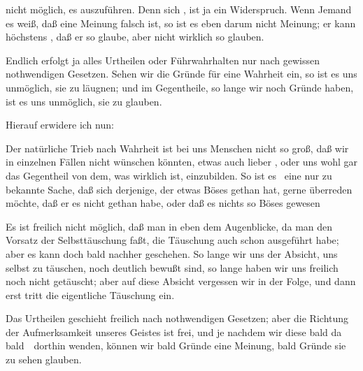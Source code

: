 \begin{aufza}
\begin{aufzb}
\item nicht möglich, es auszuführen. Denn sich , ist ja ein Widerspruch. Wenn Jemand es weiß, daß eine Meinung falsch ist, so ist es eben darum nicht  Meinung; er kann höchstens , daß er so glaube, aber nicht wirklich so glauben.
\item Endlich erfolgt ja alles Urtheilen oder Führwahrhalten nur nach gewissen nothwendigen Gesetzen. Sehen wir die Gründe für eine Wahrheit ein, so ist es uns unmöglich, sie zu läugnen; und im Gegentheile, so lange wir noch  Gründe haben, ist es uns unmöglich, sie zu glauben.
\end{aufzb}
\item Hierauf erwidere ich nun:
\begin{aufzb}
\item Der natürliche Trieb nach Wahrheit ist bei uns Menschen nicht so groß, daß wir in einzelnen Fällen nicht wünschen könnten, etwas auch lieber , oder uns wohl gar das Gegentheil von dem, was wirklich ist, einzubilden. So ist es \zB\ eine nur zu bekannte Sache, daß sich derjenige, der etwas Böses gethan hat, gerne überreden möchte, daß er es nicht gethan habe, oder daß es nichts so Böses gewesen \usw\
\item Es ist freilich nicht möglich, daß man in eben dem Augenblicke, da man den Vorsatz der Selbsttäuschung faßt, die Täuschung auch schon ausgeführt habe; aber es kann doch bald nachher geschehen. So lange wir uns der Absicht, uns selbst zu täuschen, noch deutlich bewußt sind, so lange haben wir uns freilich noch nicht getäuscht; aber auf diese Absicht vergessen wir in der Folge, und dann erst tritt die eigentliche Täuschung ein.
\item Das Urtheilen geschieht freilich nach nothwendigen Gesetzen; aber die Richtung der Aufmerksamkeit unseres Geistes ist frei, und je nachdem wir diese bald da bald~\RWSeitenw{57}\ dorthin wenden, können wir bald Gründe \RWbet{für} eine Meinung, bald Gründe \RWbet{wider} sie zu sehen glauben.
\end{aufzb}
\end{aufza}

